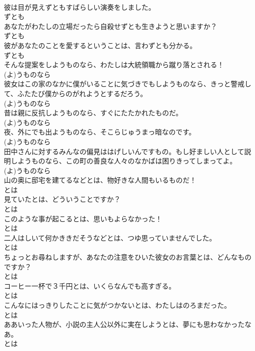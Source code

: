 \documentclass[8pt]{extreport}
\begin{document}
\begin{CJK}{UTF8}{min}
\\	彼は目が見えずともすばらしい演奏をしました。	
\\	ずとも	
\\	あなたがわたしの立場だったら自殺せずとも生きようと思いますか？	
\\	ずとも	
\\	彼があなたのことを愛するということは、言わずとも分かる。	
\\	ずとも	
\\	そんな提案をしようものなら、わたしは大統領職から蹴り落とされる！	
\\	(よ)うものなら	
\\	彼女はこの家のなかに僕がいることに気づきでもしようものなら、きっと警戒して、ふたたび僕からのがれようとするだろう。	
\\	(よ)うものなら	
\\	昔は親に反抗しようものなら、すぐにたたかれたものだ。	
\\	(よ)うものなら	
\\	夜、外にでも出ようものなら、そこらじゅうまっ暗なのです。	
\\	(よ)うものなら	
\\	田中さんに対するみんなの偏見ははげしいんですもの。もし好ましい人として説明しようものなら、この町の善良な人々のなかばは困りきってしまってよ。	
\\	(よ)うものなら	
\\	山の奥に邸宅を建てるなどとは、物好きな人間もいるものだ！	
\\	とは	
\\	見ていたとは、どういうことですか？	
\\	とは	
\\	このような事が起こるとは、思いもよらなかった！	
\\	とは	
\\	二人はしいて何かききだそうなどとは、つゆ思っていませんでした。	
\\	とは	
\\	ちょっとお尋ねしますが、あなたの注意をひいた彼女のお言葉とは、どんなものですか？	
\\	とは	
\\	コーヒー一杯で３千円とは、いくらなんでも高すぎる。	
\\	とは	
\\	こんなにはっきりしたことに気がつかないとは、わたしはのろまだった。	
\\	とは	
\\	ああいった人物が、小説の主人公以外に実在しようとは、夢にも思わなかったなあ。	
\\	とは	

\end{CJK}
\end{document}
